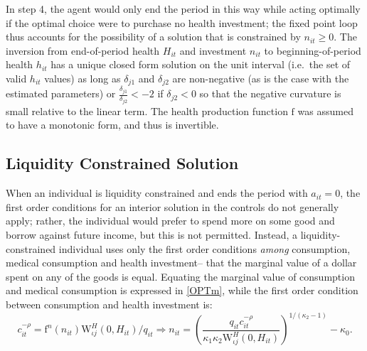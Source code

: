 \documentclass[12pt,pdftex,letterpaper]{article}
\newcommand{\Type}{\iota}
\newcommand{\Health}{h}
\newcommand{\PostHealth}{H}
\newcommand{\PostValue}{\text{W}}
\newcommand{\Con}{c}
\newcommand{\Invst}{n}
\newcommand{\Assets}{a}
\newcommand{\Copay}{q}
\newcommand{\CRRAcon}{\rho}
\newcommand{\Age}{j}
\newcommand{\HealthParam}{\delta}
\newcommand{\HealthProdFunc}{\text{f}}
\newcommand{\HealthProdParam}{\kappa}
\begin{document}
In step 4, the agent would only end the period in this way while acting optimally if the optimal choice were to purchase no health investment; the fixed point loop thus accounts for the possibility of a solution that is constrained by $\Invst_{it} \geq 0$.  The inversion from end-of-period health $\PostHealth_{it}$ and investment $\Invst_{it}$ to beginning-of-period health $\Health_{it}$ has a unique closed form solution on the unit interval (i.e.\ the set of valid $\Health_{it}$ values) as long as $\HealthParam_{\Age 1}$ and $\HealthParam_{\Age 2}$ are non-negative (as is the case with the estimated parameters) or $\frac{\HealthParam_{\Age 1}}{\HealthParam_{\Age 2}} < -2$ if $\HealthParam_{\Age 2} < 0$ so that the negative curvature is small relative to the linear term.  The health production function $\HealthProdFunc$ was assumed to have a monotonic form, and thus is invertible.


\subsection{Liquidity Constrained Solution}
\label{app:LiqCnstSolution}

When an individual is liquidity constrained and ends the period with $\Assets_{it}=0$, the first order conditions for an interior solution in the controls do not generally apply; rather, the individual would prefer to spend more on some good and borrow against future income, but this is not permitted.  Instead, a liquidity-constrained individual uses only the first order conditions \textit{among} consumption, medical consumption and health investment-- that the marginal value of a dollar spent on any of the goods is equal.  Equating the marginal value of consumption and medical consumption is expressed in \eqref{OPTm}, while the first order condition between consumption and health investment is:
\begin{equation}\label{OPTnCnst}
\Con_{it}^{-\CRRAcon} = \HealthProdFunc^\Invst(\Invst_{it}) \PostValue^\PostHealth_{\Type \Age}(0,\PostHealth_{it})/\Copay_{it} \Longrightarrow \Invst_{it} = \left( \frac{\Copay_{it} \Con_{it}^{-\CRRAcon}}{\HealthProdParam_1 \HealthProdParam_2 \PostValue_{\iota j}^\PostHealth(0,\PostHealth_{it})} \right)^{1/(\HealthProdParam_2 - 1)} - \HealthProdParam_0.
\end{equation}
\end{document}
